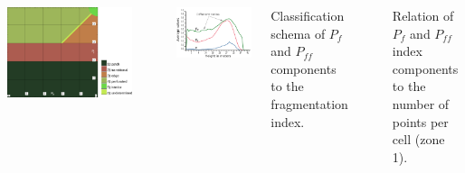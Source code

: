 \documentclass[25pt, margin=0mm, innermargin=15mm, blockverticalspace=15mm, colspace=15mm, subcolspace=8mm]{tikzposter}
\begin{document}
\begin{columns}
{\begin{minipage}{0.48\linewidth}
\centering
\includegraphics[width=\textwidth]{index_values_pf_pff}
\end{minipage}
~
\begin{minipage}{0.48\linewidth}
\centering
\includegraphics[width=\textwidth]{zonal_plot_n_pf_pff_zone_1}
\end{minipage}

\bigskip

\begin{minipage}{0.48\linewidth}
Classification schema of $P_f$ and $P_{f\!f}$ components to the fragmentation index.
\end{minipage}
~
\begin{minipage}{0.48\linewidth}
Relation of $P_f$ and $P_{f\!f}$ index components to the number of points per cell
(zone 1).
\end{minipage}

}
\end{columns}
\end{document}
